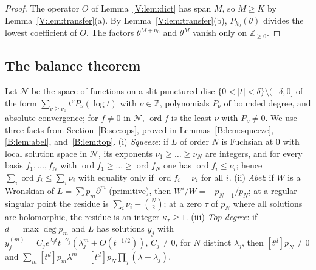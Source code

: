 \documentclass[11pt,a4paper]{article}
\theoremstyle{definition}
\theoremstyle{remark}
\newcommand{\Z}{\mathbb Z}
\newcommand{\ff}[2]{#1^{\underline{#2}}}
\DeclareMathOperator{\ord}{ord}
\numberwithin{equation}{section}
\begin{document}
\begin{proof}
The operator $O$ of Lemma~\ref{V:lem:dict} has span $M$, so $M\ge K$ by Lemma~\ref{V:lem:transfer}(a). By Lemma~\ref{V:lem:transfer}(b), $P_{k_0}(\theta)$ divides the lowest coefficient of $O$. The factors $\ff{\theta}{M+n_0}$ and $\ff{\theta}{M}$ vanish only on $\Z_{\ge0}$.
\end{proof}

\subsection{The balance theorem}
Let $\mathcal N$ be the space of functions on a slit punctured disc $\{0<|t|<\delta\}\setminus(-\delta,0]$ of the form $\sum_{\nu\ge\nu_0}t^\nu P_\nu(\log t)$ with $\nu\in\Z$, polynomials $P_\nu$ of bounded degree, and absolute convergence; for $f\ne0$ in $\mathcal N$, $\ord f$ is the least $\nu$ with $P_\nu\ne0$. We use three facts from Section~\ref{B:sec:ops}, proved in Lemmas~\ref{B:lem:squeeze}, \ref{B:lem:abel}, and~\ref{B:lem:top}. (i) \emph{Squeeze}: if $L$ of order $N$ is Fuchsian at $0$ with local solution space in $\mathcal N$, its exponents $\nu_1\ge\dots\ge\nu_N$ are integers, and for every basis $f_1,\dots,f_N$ with $\ord f_1\ge\dots\ge\ord f_N$ one has $\ord f_i\le\nu_i$; hence $\sum_i\ord f_i\le\sum_i\nu_i$ with equality only if $\ord f_i=\nu_i$ for all $i$. (ii) \emph{Abel}: if $W$ is a Wronskian of $L=\sum p_m\partial^m$ (primitive), then $W'/W=-p_{N-1}/p_N$; at a regular singular point the residue is $\sum_i\nu_i-\binom N2$; at a zero $\tau$ of $p_N$ where all solutions are holomorphic, the residue is an integer $\kappa_\tau\ge1$. (iii) \emph{Top degree}: if $d=\max\deg p_m$ and $L$ has solutions $y_j$ with $y_j^{(m)}=C_je^{\lambda_jt}t^{-\gamma_j}(\lambda_j^m+O(t^{-1/2}))$, $C_j\ne0$, for $N$ distinct $\lambda_j$, then $[t^d]p_N\ne0$ and $\sum_m[t^d]p_m\lambda^m=[t^d]p_N\prod_j(\lambda-\lambda_j)$.
\end{document}
